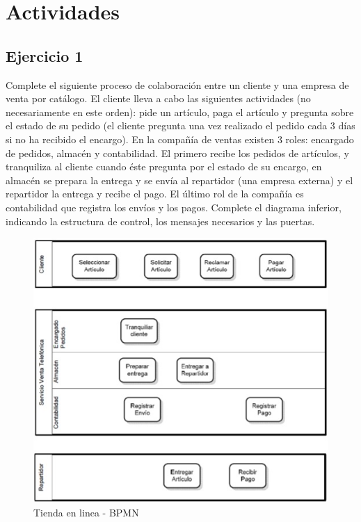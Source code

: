 \documentclass[12pt,letterpaper]{article}
\begin{document}
\section{Actividades}

\subsection{\textbf{Ejercicio 1}}
Complete el siguiente proceso de colaboración entre un cliente y una empresa de venta por catálogo. El cliente lleva a cabo las siguientes actividades (no necesariamente en este orden): pide un artículo, paga el artículo y pregunta sobre el estado de su pedido (el cliente pregunta una vez realizado el pedido cada 3 días si no ha recibido el encargo). En la compañía de ventas existen 3 roles: encargado de pedidos, almacén y contabilidad. El primero recibe los pedidos de artículos, y tranquiliza al cliente cuando éste pregunta por el estado de su encargo, en almacén se prepara la entrega y se envía al repartidor (una empresa externa) y el repartidor la entrega y recibe el pago. El último rol de la compañía es contabilidad que registra los envíos y los pagos. Complete el diagrama inferior, indicando la estructura de control, los mensajes necesarios y las puertas.\\

	\begin{figure}[H]
		\centering
		\includegraphics[scale=0.7]{img/ej1.jpg}     
		\caption{Tienda en linea - BPMN }
	\label{fig:rc}
	\end{figure}
	\vspace{1cm}
	
\end{document}
